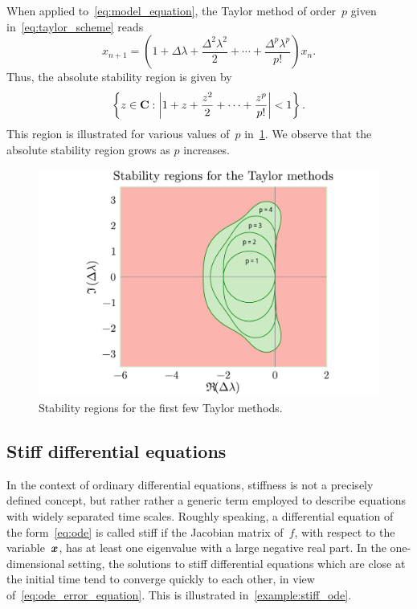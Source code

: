 \begin{example}
    When applied to~\eqref{eq:model_equation},
    the Taylor method of order~$p$ given in~\eqref{eq:taylor_scheme} reads
    \[
        x_{n+1} = \left(1 + \Delta \lambda + \frac{\Delta^2 \lambda^2}{2} + \dotsb + \frac{\Delta^p \lambda^p}{p!} \right) x_n.
    \]
    Thus, the absolute stability region is given by
    \[
        \left\{ z \in \mathbf C : \left\lvert 1 + z + \frac{z^2}{2} + \dotsb + \frac{z^p}{p!} \right\rvert < 1 \right\}.
    \]
    This region is illustrated for various values of~$p$ in~\cref{fig:stab_taylor}.
    We observe that the absolute stability region grows as $p$ increases.
\end{example}

\begin{figure}[ht]
    \centering
    \includegraphics[width=0.70\linewidth]{figures/stability_Taylor_methods.pdf}
    \caption{Stability regions for the first few Taylor methods.}%
    \label{fig:stab_taylor}
\end{figure}

\subsection*{Stiff differential equations}
In the context of ordinary differential equations, 
stiffness is not a precisely defined concept,
but rather rather a generic term employed to describe equations with widely separated time scales.
Roughly speaking, a differential equation of the form~\eqref{eq:ode} is called stiff if the Jacobian matrix of~$f$,
with respect to the variable~$\mathbf{\boldsymbol{x}}$,
has at least one eigenvalue with a large negative real part.
In the one-dimensional setting,
the solutions to stiff differential equations which are close at the initial time tend to converge quickly to each other,
in view of~\eqref{eq:ode_error_equation}.
This is illustrated in~\cref{example:stiff_ode}.

